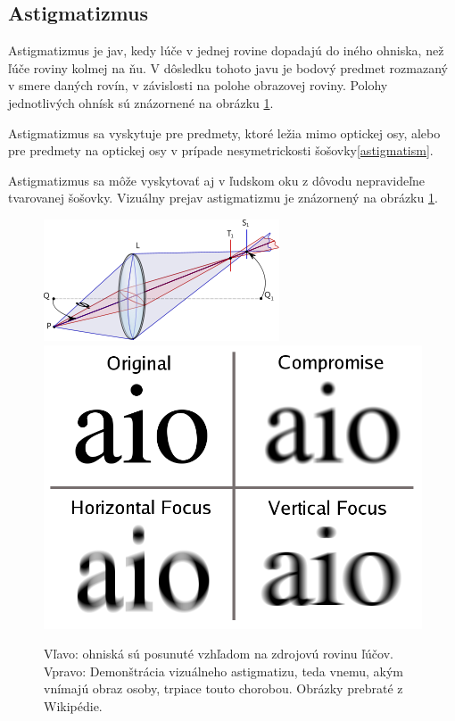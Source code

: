 \subsection{Astigmatizmus}
Astigmatizmus je jav, kedy lúče v jednej rovine dopadajú do iného ohniska, než ľúče roviny kolmej na
ňu. V dôsledku tohoto javu je bodový predmet rozmazaný v smere daných rovín, v závislosti na polohe
obrazovej roviny. Polohy jednotlivých ohnísk sú znázornené na obrázku \ref{comaDescribe}.

Astigmatizmus sa vyskytuje pre predmety, ktoré ležia mimo optickej osy, alebo pre predmety na
optickej osy v prípade nesymetrickosti šošovky\ref{astigmatism}.

Astigmatizmus sa môže vyskytovať aj v ľudskom oku z dôvodu nepravideľne tvarovanej šošovky. 
Vizuálny prejav astigmatizmu je znázornený na obrázku \ref{comaDescribe}.

\begin{figure}[h]
    \label{comaDescribe}
\includegraphics[scale=0.30]{obrazky-figures/astigmatismRays.png}
\includegraphics[scale=0.30]{obrazky-figures/astigmatism.png}
    \centering \caption{Vľavo: ohniská sú posunuté vzhľadom na zdrojovú rovinu ľúčov.
     Vpravo: Demonštrácia vizuálneho astigmatizu, teda vnemu, akým vnímajú obraz osoby,
    trpiace touto chorobou. Obrázky prebraté z Wikipédie\cite{astigmatism}.}
\end{figure}



